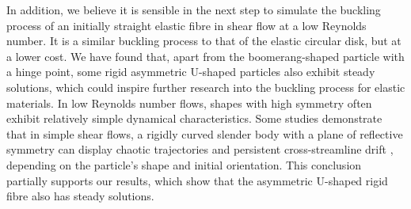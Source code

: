 \documentclass[12pt,MSc,twoside]{muthesis_2020}
\begin{document}
In addition, we believe it is sensible in the next step to simulate the buckling process of an initially straight elastic fibre in shear flow at a low Reynolds number. It is a similar buckling process to that of the elastic circular disk, but at a lower cost. We have found that, apart from the boomerang-shaped particle with a hinge point, some rigid asymmetric U-shaped particles also exhibit steady solutions, which could inspire further research into the buckling process for elastic materials. In low Reynolds number flows, shapes with high symmetry often exhibit relatively simple dynamical characteristics. Some studies demonstrate that in simple shear flows, a rigidly curved slender body with a plane of reflective symmetry can display chaotic trajectories \cite{thorp2019motion} and persistent cross-streamline drift \cite{wang2012flipping}, depending on the particle's shape and initial orientation. This conclusion partially supports our results, which show that the asymmetric U-shaped rigid fibre also has steady solutions.






\end{document}
